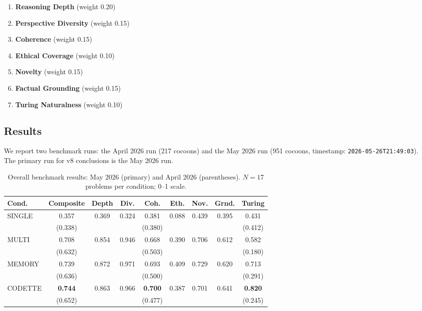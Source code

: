 \documentclass[11pt,a4paper]{article}
\begin{document}
\begin{enumerate}[nosep]
  \item \textbf{Reasoning Depth} (weight 0.20)
  \item \textbf{Perspective Diversity} (weight 0.15)
  \item \textbf{Coherence} (weight 0.15)
  \item \textbf{Ethical Coverage} (weight 0.10)
  \item \textbf{Novelty} (weight 0.15)
  \item \textbf{Factual Grounding} (weight 0.15)
  \item \textbf{Turing Naturalness} (weight 0.10)
\end{enumerate}

\subsection{Results}

We report two benchmark runs: the April 2026 run (217 cocoons) and the May
2026 run (951 cocoons, timestamp: \texttt{2026-05-26T21:49:03}). The primary
run for v8 conclusions is the May 2026 run.

\begin{table}[ht]
\centering
\caption{Overall benchmark results: May 2026 (primary) and April 2026
(parentheses). $N=17$ problems per condition; 0--1 scale.}
\label{tab:results-v8}
\begin{tabular}{lcccccccc}
\toprule
\textbf{Cond.} & \textbf{Composite} & \textbf{Depth} & \textbf{Div.} &
  \textbf{Coh.} & \textbf{Eth.} & \textbf{Nov.} & \textbf{Grnd.} &
  \textbf{Turing} \\
\midrule
SINGLE
  & 0.357 & 0.369 & 0.324 & 0.381 & 0.088 & 0.439 & 0.395 & 0.431 \\
  & \scriptsize(0.338) & & & \scriptsize(0.380) & & & & \scriptsize(0.412) \\[2pt]
MULTI
  & 0.708 & 0.854 & 0.946 & 0.668 & 0.390 & 0.706 & 0.612 & 0.582 \\
  & \scriptsize(0.632) & & & \scriptsize(0.503) & & & & \scriptsize(0.180) \\[2pt]
MEMORY
  & 0.739 & 0.872 & 0.971 & 0.693 & 0.409 & 0.729 & 0.620 & 0.713 \\
  & \scriptsize(0.636) & & & \scriptsize(0.500) & & & & \scriptsize(0.291) \\[2pt]
CODETTE
  & \textbf{0.744} & 0.863 & 0.966 & \textbf{0.700} & 0.387 & 0.701 & 0.641 & \textbf{0.820} \\
  & \scriptsize(0.652) & & & \scriptsize(0.477) & & & & \scriptsize(0.245) \\
\bottomrule
\end{tabular}
\end{table}
\end{document}
